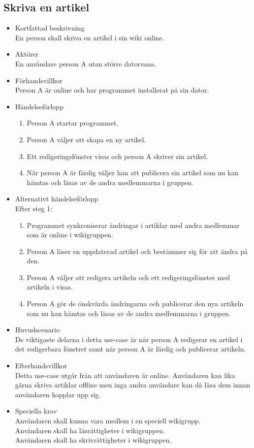 \subsection{Skriva en artikel}
\begin{itemize}
	\item Kortfattad beskrivning
	\\En person skall skriva en artikel i sin wiki online.
	\item Aktörer
	\\En användare person A utan större datorvana.
	\item Förhandsvillkor
	\\Person A är online och har programmet installerat på sin dator.
	\item Händelseförlopp
	\begin{enumerate}
		\item Person A startar programmet.
		\item Person A väljer att skapa en ny artikel.
		\item Ett redigeringsfönster visas och person A skriver sin artikel.
		\item När person A är färdig väljer han att publicera sin artikel som nu kan hämtas och läsas av de andra medlemmarna i gruppen.
	\end{enumerate}
	\item Alternativt händelseförlopp
	\\Efter steg 1:
	\begin{enumerate}	
		\item Programmet synkroniserar ändringar i artiklar med andra medlemmar som är online i wikigruppen.
		\item Person A läser en uppdaterad artikel och bestämmer sig för att ändra på den.
		\item Person A väljer att redigera artikeln och ett redigeringsfönster med artikeln i visas.
		\item Person A gör de önskvärda ändringarna	och publicerar den nya artikeln	som nu kan hämtas och läsas av de andra medlemmarna i gruppen.
	\end{enumerate}
	\item Huvudscenario
	\\De viktigaste delarna i detta use-case är när person A redigerar en artikel i det redigerbara fönstret samt när person A är färdig och publicerar artikeln.
	\item Efterhandsvillkor
	\\Detta use-case utgår från att användaren är online. Användaren kan lika gärna skriva artiklar offline men inga  andra användare kan då läsa dem innan användaren kopplar upp sig.
	\item Speciella krav
	\\Användaren skall kunna vara medlem i en speciell wikigrupp.
	\\Användaren skall ha läsrättigheter i wikigruppen.
	\\Användaren skall ha skrivrättigheter i wikigruppen.
\end{itemize}

